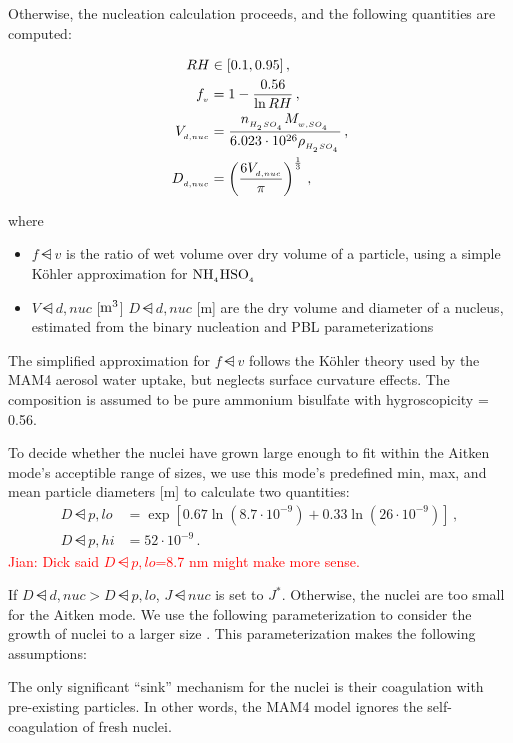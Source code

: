 Otherwise, the nucleation calculation proceeds, and the following quantities are
computed:

\begin{align}
  RH &\in [0.1, 0.95] \,, \\
  f_{_{v}} &= 1 - \frac{0.56}{\ln RH} \,, \\
  V_{_{d,nuc}} &= \frac{n_{_{H_{_2}SO_{_4}}} M_{_{w,SO_{_4}}}}
                   {6.023 \cdot 10^{26} \rho_{_{H_{_2}SO_{_4}}}} \,, \\
  D_{_{d,nuc}} &= \left( \frac{6 V_{_{d,nuc}}}{\pi} \right)^{\frac{1}{3}} \,,
\end{align}

where

\begin{itemize}
  \item $f\dsub{v}$ is the ratio of wet volume over dry volume of a particle,
        using a simple K\"ohler approximation for $\rm NH_{_{4}}HSO_{_{4}}$
  \item $V\dsub{d,nuc}$ [$\rm m^3$] $D\dsub{d,nuc}$ [m] are the dry volume and
        diameter of a nucleus, estimated from the binary nucleation and PBL
        parameterizations
\end{itemize}

The simplified approximation for $f\dsub{v}$ follows the K\"ohler theory used by
the MAM4 aerosol water uptake, but neglects surface curvature effects. The
composition is assumed to be pure ammonium bisulfate with hygroscopicity = 0.56.

To decide whether the nuclei have grown large enough to fit within the Aitken
mode's acceptible range of sizes, we use this mode's predefined min, max, and
mean particle diameters [m] to calculate two quantities:
\begin{align}
  D\dsub{p,lo} &= \exp \left[ 0.67 \ln (8.7 \cdot 10^{-9}) +
                            0.33 \ln (26 \cdot 10^{-9}) \right] \,, \\   %
  D\dsub{p,hi} &= 52 \cdot 10^{-9} \,.
\end{align}
\textcolor{red}{Jian: Dick said $D\dsub{p,lo}$=8.7 nm might make more sense.}

If $D\dsub{d,nuc} > D\dsub{p,lo}$, $J\dsub{nuc}$ is set to $J^*$. Otherwise,
the nuclei are too small for the Aitken mode. We use the following
parameterization to consider the growth of nuclei to a larger size
\cite{kerminen-2002-jas}. This parameterization makes the following assumptions:

\begin{assume}
  The only significant ``sink'' mechanism for the nuclei is their coagulation
  with pre-existing particles. In other words, the MAM4 model ignores
  the self-coagulation of fresh nuclei.
\end{assume}

